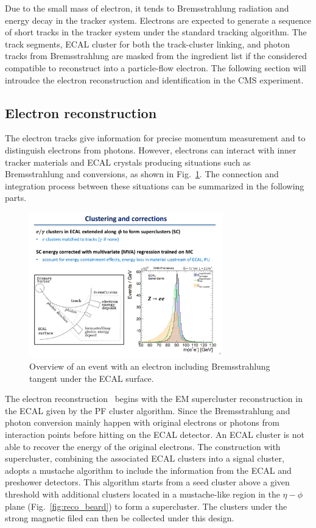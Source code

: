 Due to the small mass of electron, it tends to Bremsstrahlung radiation and energy decay in the tracker system.
Electrons are expected to generate a sequence of short tracks in the tracker system under the standard tracking algorithm.
The track segments, ECAL cluster for both the track-cluster linking, and photon tracks from Bremsstrahlung are masked from the ingredient list if the considered compatible to reconstruct into a particle-flow electron.
The following section will introudce the electron reconstruction and identification in the CMS experiment.

\subsection{Electron reconstruction}
The electron tracks give information for precise momentum measurement and to distinguish electrons from photons.
However, electrons can interact with inner tracker materials and ECAL crystals producing situations such as Bremsstrahlung and conversions, as shown in Fig.~\ref{fig:reco_el_track}.
The connection and integration process between these situations can be summarized in the following parts.

\begin{figure}\centering
    \includegraphics[width=0.75\textwidth]{figure/reco_el_track.pdf}
    \caption
    {
    Overview of an event with an electron including Bremsstrahlung tangent under the ECAL surface.
    }
    \label{fig:reco_el_track}
\end{figure}

The electron reconstruction~\cite{CMS:el_reliso} begins with the EM supercluster reconstruction in the ECAL given by the PF cluster algorithm.
Since the Bremsstrahlung and photon conversion mainly happen with original electrons or photons from interaction points before hitting on the ECAL detector.
An ECAL cluster is not able to recover the energy of the original electrons.
The construction with supercluster, combining the associated ECAL clusters into a signal cluster, adopts a mustache algorithm to include the information from the ECAL and preshower detectors.
This algorithm starts from a seed cluster above a given threshold with additional clusters located in a mustache-like region in the $\eta-\phi$ plane (Fig.~\ref{fig:reco_beard}) to form a supercluster.
The clusters under the strong magnetic filed can then be collected under this design.

